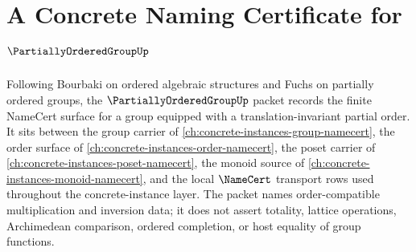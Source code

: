\chapter{A Concrete Naming Certificate for $\PartiallyOrderedGroupUp$}
\label{ch:concrete-instances-partially-ordered-group-namecert}

Following Bourbaki on ordered algebraic structures and Fuchs on partially ordered groups, the $\PartiallyOrderedGroupUp$ packet records the finite NameCert surface for a group equipped with a translation-invariant partial order. It sits between the group carrier of \autoref{ch:concrete-instances-group-namecert}, the order surface of \autoref{ch:concrete-instances-order-namecert}, the poset carrier of \autoref{ch:concrete-instances-poset-namecert}, the monoid source of \autoref{ch:concrete-instances-monoid-namecert}, and the local $\NameCert$ transport rows used throughout the concrete-instance layer. The packet names order-compatible multiplication and inversion data; it does not assert totality, lattice operations, Archimedean comparison, ordered completion, or host equality of group functions.

